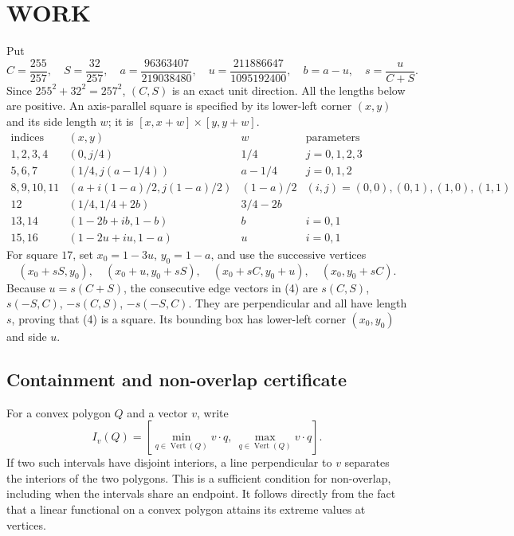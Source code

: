 \section{WORK}
Put
\[
C=\frac{255}{257},\quad S=\frac{32}{257},\quad
a=\frac{96363407}{219038480},\quad
u=\frac{211886647}{1095192400},\quad b=a-u,\quad s=\frac{u}{C+S}.
\tag{2}
\]
Since $255^2+32^2=257^2$, $(C,S)$ is an exact unit direction. All the lengths below are positive. An axis-parallel square is specified by its lower-left corner $(x,y)$ and its side length $w$; it is $[x,x+w]\times[y,y+w]$.
\[
\begin{array}{c|c|c|c}
\text{indices}&(x,y)&w&\text{parameters}\\\hline
1,2,3,4&(0,j/4)&1/4&j=0,1,2,3\\
5,6,7&(1/4,j(a-1/4))&a-1/4&j=0,1,2\\
8,9,10,11&(a+i(1-a)/2,j(1-a)/2)&(1-a)/2&(i,j)=(0,0),(0,1),(1,0),(1,1)\\
12&(1/4,1/4+2b)&3/4-2b&\\
13,14&(1-2b+ib,1-b)&b&i=0,1\\
15,16&(1-2u+iu,1-a)&u&i=0,1
\end{array}
\tag{3}
\]
For square $17$, set $x_0=1-3u$, $y_0=1-a$, and use the successive vertices
\[
(x_0+sS,y_0),\quad(x_0+u,y_0+sS),\quad
(x_0+sC,y_0+u),\quad(x_0,y_0+sC).
\tag{4}
\]
Because $u=s(C+S)$, the consecutive edge vectors in (4) are $s(C,S)$, $s(-S,C)$, $-s(C,S)$, $-s(-S,C)$. They are perpendicular and all have length $s$, proving that (4) is a square. Its bounding box has lower-left corner $(x_0,y_0)$ and side $u$.

\subsection{Containment and non-overlap certificate}
For a convex polygon $Q$ and a vector $v$, write
\[
I_v(Q)=[\min_{q\in\operatorname{Vert}(Q)}v\cdot q,\ \max_{q\in\operatorname{Vert}(Q)}v\cdot q].
\]
If two such intervals have disjoint interiors, a line perpendicular to $v$ separates the interiors of the two polygons. This is a sufficient condition for non-overlap, including when the intervals share an endpoint. It follows directly from the fact that a linear functional on a convex polygon attains its extreme values at vertices.

